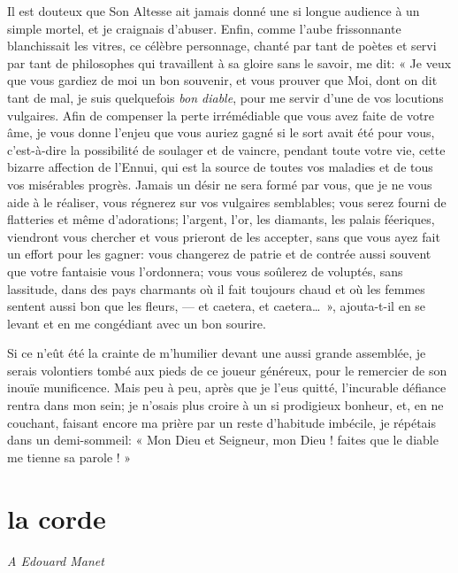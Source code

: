 Il est douteux que Son Altesse ait jamais donné une si longue audience à
un simple mortel, et je craignais d’abuser. Enfin,
comme l’aube frissonnante blanchissait les vitres, ce
célèbre personnage, chanté par tant de poètes et servi par tant de
philosophes qui travaillent à sa gloire sans le savoir, me dit: « Je
veux que vous gardiez de moi un bon souvenir, et vous prouver que Moi,
dont on dit tant de mal, je suis quelquefois \textit{bon diable}, pour me servir
d’une de vos locutions vulgaires. Afin de compenser la
perte irrémédiable que vous avez faite de votre âme, je vous donne
l’enjeu que vous auriez gagné si le sort avait été
pour vous, c’est{}-à{}-dire la possibilité de soulager
et de vaincre, pendant toute votre vie, cette bizarre affection de
l’Ennui, qui est la source de toutes vos maladies et
de tous vos misérables progrès. Jamais un désir ne sera formé par vous,
que je ne vous aide à le réaliser, vous régnerez sur vos vulgaires
semblables; vous serez fourni de flatteries et même
d’adorations; l’argent,
l’or, les diamants, les palais féeriques, viendront
vous chercher et vous prieront de les accepter, sans que vous ayez fait
un effort pour les gagner: vous changerez de patrie et de contrée aussi
souvent que votre fantaisie vous l’ordonnera; vous
vous soûlerez de voluptés, sans lassitude, dans des pays charmants où
il fait toujours chaud et où les femmes sentent aussi bon que les
fleurs, --- et caetera, et caetera\ldots\ », ajouta{}-t{}-il en se levant et
en me congédiant avec un bon sourire.

Si ce n’eût été la crainte de
m’humilier devant une aussi grande assemblée, je
serais volontiers tombé aux pieds de ce joueur généreux, pour le
remercier de son inouïe munificence. Mais peu à peu, après que je
l’eus quitté, l’incurable défiance
rentra dans mon sein; je n’osais plus croire à un si
prodigieux bonheur, et, en ne couchant, faisant encore ma prière par un
reste d’habitude imbécile, je répétais dans un
demi{}-sommeil: « Mon Dieu et Seigneur, mon Dieu ! faites que le diable
me tienne sa parole ! »

\quebra\section[La corde]{la corde }

\begin{flushright}
\textit{A Edouard Manet}
\end{flushright}

